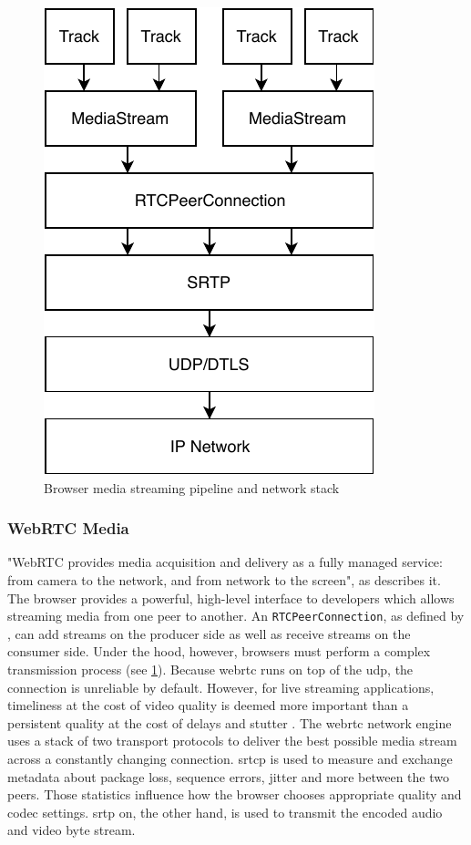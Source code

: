 \begin{figure}
\centering
\includegraphics[width=.5\textwidth]{graphics/media-stream-pipeline.pdf}
\caption{Browser media streaming pipeline and network stack}
\label{fig:pipeline}
\end{figure}

\subsubsection{WebRTC Media}\label{sec:webrtc-media}

"WebRTC provides media acquisition and delivery as a fully managed service: from camera to the network, and from network to the screen", as \citet[\S18.5]{high-performance-browser-networking} describes it. The browser provides a powerful, high-level interface to developers which allows streaming media from one peer to another. An \lstinline|RTCPeerConnection|, as defined by \citet[\S4.4]{webrtc-w3c}, can add streams on the producer side as well as receive streams on the consumer side. Under the hood, however, browsers must perform a complex transmission process (see \cref{fig:pipeline}). Because \gls{webrtc} runs on top of the \gls{udp}, the connection is unreliable by default. However, for live streaming applications, timeliness at the cost of video quality is deemed more important than a persistent quality at the cost of delays and stutter \cite[\S18.3]{high-performance-browser-networking}. The \gls{webrtc} network engine uses a stack of two transport protocols to deliver the best possible media stream across a constantly changing connection. \Gls{srtcp} is used to measure and exchange metadata about package loss, sequence errors, jitter and more between the two peers. Those statistics influence how the browser chooses appropriate quality and codec settings. \gls{srtp} on, the other hand, is used to transmit the encoded audio and video byte stream.


